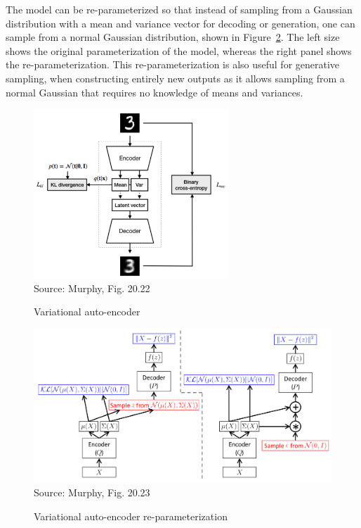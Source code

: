 The model can be re-parameterized so that instead of sampling from a Gaussian distribution with a mean and variance vector for decoding or generation, one can sample from a normal Gaussian distribution, shown in Figure~\ref{fig:murphy_20_23}. The left size shows the original parameterization of the model, whereas the right panel shows the re-parameterization. This re-parameterization is also useful for generative sampling, when constructing entirely new outputs as it allows sampling from a normal Gaussian that requires no knowledge of means and variances.

\begin{figure}
\centering
\includegraphics[height=2.5in]{murphy_20_22.png}\\

\scriptsize Source: Murphy, Fig. 20.22 \normalsize
\caption{Variational auto-encoder}
\label{fig:murphy_20_22}
\end{figure}


\begin{figure}
\begin{center}
\includegraphics[width=\textwidth]{murphy_20_23.png}\\

\scriptsize Source: Murphy, Fig. 20.23 \normalsize
\end{center}
\caption{Variational auto-encoder re-parameterization}
\label{fig:murphy_20_23}
\end{figure}

